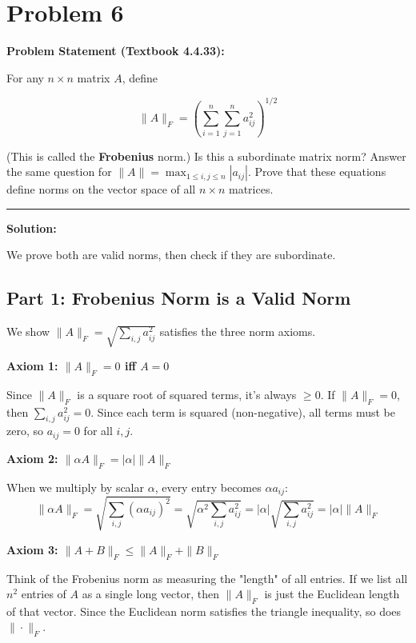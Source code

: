 \clearpage
\section*{Problem 6}

\textbf{Problem Statement (Textbook 4.4.33):} 

For any $n \times n$ matrix $A$, define

$$\|A\|_F = \left(\sum_{i=1}^{n} \sum_{j=1}^{n} a_{ij}^2\right)^{1/2}$$

(This is called the \textbf{Frobenius} norm.) Is this a subordinate matrix norm? Answer the same question for $\|A\| = \max_{1 \leq i,j \leq n} |a_{ij}|$. Prove that these equations define norms on the vector space of all $n \times n$ matrices.

\noindent\rule{\textwidth}{0.4pt}

\vspace{1em}

\textbf{Solution:}

We prove both are valid norms, then check if they are subordinate.

\subsection*{Part 1: Frobenius Norm is a Valid Norm}

We show $\|A\|_F = \sqrt{\sum_{i,j} a_{ij}^2}$ satisfies the three norm axioms.

\textbf{Axiom 1: $\|A\|_F = 0$ iff $A = 0$}

Since $\|A\|_F$ is a square root of squared terms, it's always $\geq 0$. If $\|A\|_F = 0$, then $\sum_{i,j} a_{ij}^2 = 0$. Since each term is squared (non-negative), all terms must be zero, so $a_{ij} = 0$ for all $i,j$.

\textbf{Axiom 2: $\|\alpha A\|_F = |\alpha| \|A\|_F$}

When we multiply by scalar $\alpha$, every entry becomes $\alpha a_{ij}$:
$$\|\alpha A\|_F = \sqrt{\sum_{i,j} (\alpha a_{ij})^2} = \sqrt{\alpha^2 \sum_{i,j} a_{ij}^2} = |\alpha| \sqrt{\sum_{i,j} a_{ij}^2} = |\alpha| \|A\|_F$$

\textbf{Axiom 3: $\|A + B\|_F \leq \|A\|_F + \|B\|_F$}

Think of the Frobenius norm as measuring the "length" of all entries. If we list all $n^2$ entries of $A$ as a single long vector, then $\|A\|_F$ is just the Euclidean length of that vector. Since the Euclidean norm satisfies the triangle inequality, so does $\|\cdot\|_F$.

